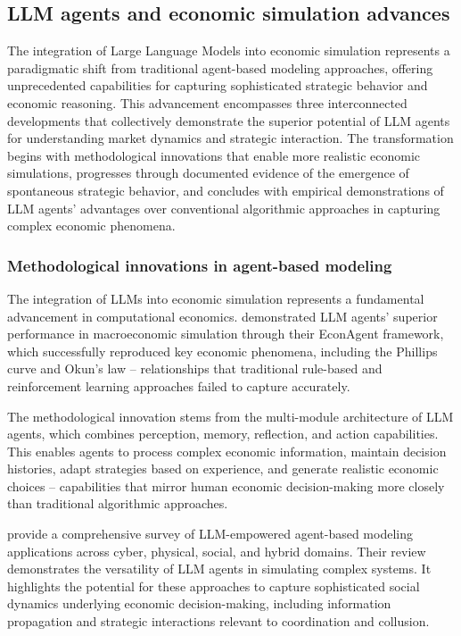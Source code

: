 \subsection{LLM agents and economic simulation advances}

The integration of Large Language Models into economic simulation represents a paradigmatic shift from traditional agent-based modeling approaches, offering unprecedented capabilities for capturing sophisticated strategic behavior and economic reasoning. This advancement encompasses three interconnected developments that collectively demonstrate the superior potential of LLM agents for understanding market dynamics and strategic interaction. The transformation begins with methodological innovations that enable more realistic economic simulations, progresses through documented evidence of the emergence of spontaneous strategic behavior, and concludes with empirical demonstrations of LLM agents' advantages over conventional algorithmic approaches in capturing complex economic phenomena.

\subsubsection*{Methodological innovations in agent-based modeling}

The integration of LLMs into economic simulation represents a fundamental advancement in computational economics. \textcite{li_econagent_2024, li_large_2023} demonstrated LLM agents' superior performance in macroeconomic simulation through their EconAgent framework, which successfully reproduced key economic phenomena, including the Phillips curve and Okun's law -- relationships that traditional rule-based and reinforcement learning approaches failed to capture accurately.

The methodological innovation stems from the multi-module architecture of LLM agents, which combines perception, memory, reflection, and action capabilities. This enables agents to process complex economic information, maintain decision histories, adapt strategies based on experience, and generate realistic economic choices -- capabilities that mirror human economic decision-making more closely than traditional algorithmic approaches.

\textcite{gao_large_2024} provide a comprehensive survey of LLM-empowered agent-based modeling applications across cyber, physical, social, and hybrid domains. Their review demonstrates the versatility of LLM agents in simulating complex systems. It highlights the potential for these approaches to capture sophisticated social dynamics underlying economic decision-making, including information propagation and strategic interactions relevant to coordination and collusion.

